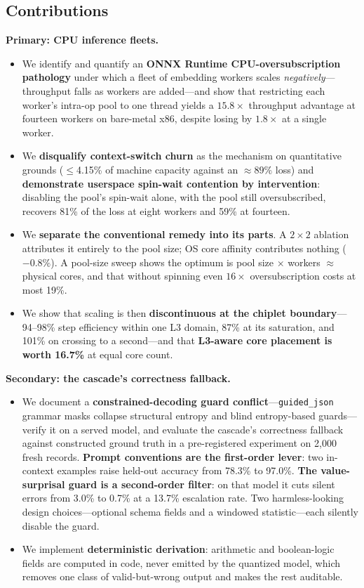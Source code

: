 \documentclass[conference]{IEEEtran}
\begin{document}
\subsection{Contributions}
\noindent\textbf{Primary: CPU inference fleets.}
\begin{itemize}
\item We identify and quantify an \textbf{ONNX Runtime CPU-oversubscription pathology} under which a fleet of embedding workers scales \emph{negatively}---throughput falls as workers are added---and show that restricting each worker's intra-op pool to one thread yields a $15.8\times$ throughput advantage at fourteen workers on bare-metal x86, despite losing by $1.8\times$ at a single worker.
\item We \textbf{disqualify context-switch churn} as the mechanism on quantitative grounds ($\leq$4.15\% of machine capacity against an ${\approx}89\%$ loss) and \textbf{demonstrate userspace spin-wait contention by intervention}: disabling the pool's spin-wait alone, with the pool still oversubscribed, recovers 81\% of the loss at eight workers and 59\% at fourteen.
\item We \textbf{separate the conventional remedy into its parts}. A $2\times2$ ablation attributes it entirely to the pool size; OS core affinity contributes nothing ($-0.8\%$). A pool-size sweep shows the optimum is pool size $\times$ workers $\approx$ physical cores, and that without spinning even $16\times$ oversubscription costs at most 19\%.
\item We show that scaling is then \textbf{discontinuous at the chiplet boundary}---94--98\% step efficiency within one L3 domain, 87\% at its saturation, and 101\% on crossing to a second---and that \textbf{L3-aware core placement is worth 16.7\%} at equal core count.
\end{itemize}
\noindent\textbf{Secondary: the cascade's correctness fallback.}
\begin{itemize}
\item We document a \textbf{constrained-decoding guard conflict}---\texttt{guided\_json} grammar masks collapse structural entropy and blind entropy-based guards---verify it on a served model, and evaluate the cascade's correctness fallback against constructed ground truth in a pre-registered experiment on 2{,}000 fresh records. \textbf{Prompt conventions are the first-order lever}: two in-context examples raise held-out accuracy from 78.3\% to 97.0\%. \textbf{The value-surprisal guard is a second-order filter}: on that model it cuts silent errors from 3.0\% to 0.7\% at a 13.7\% escalation rate. Two harmless-looking design choices---optional schema fields and a windowed statistic---each silently disable the guard.
\item We implement \textbf{deterministic derivation}: arithmetic and boolean-logic fields are computed in code, never emitted by the quantized model, which removes one class of valid-but-wrong output and makes the rest auditable.
\end{itemize}
\end{document}
